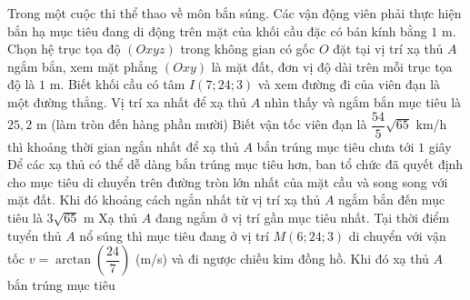 \begin{ex}%
	Trong một cuộc thi thể thao về môn bắn súng. Các vận động viên phải thực hiện bắn hạ mục tiêu đang di động trên mặt của khối cầu đặc có bán kính bằng $1$ m. Chọn hệ trục tọa độ $(Oxyz)$ trong không gian có gốc $O$ đặt tại vị trí xạ thủ $A$ ngắm bắn, xem mặt phẳng $(Oxy)$ là mặt đất, đơn vị độ dài trên mỗi trục tọa độ là $1$ m. Biết khối cầu có tâm $I(7;24;3)$ và xem đường đi của viên đạn là một đường thẳng.
	\choiceTF
	{\True Vị trí xa nhất để xạ thủ $A$ nhìn thấy và ngắm bắn mục tiêu là $25,2$ m (làm tròn đến hàng phần mười)}
	{\True Biết vận tốc viên đạn là $\dfrac{54}{5}\sqrt{65}$ km/h thì khoảng thời gian ngắn nhất để xạ thủ $A$ bắn trúng mục tiêu chưa tới $1$ giây}
	{\True Để các xạ thủ có thể dễ dàng bắn trúng mục tiêu hơn, ban tổ chức đã quyết định cho mục tiêu di chuyển trên đường tròn lớn nhất của mặt cầu và song song với mặt đất. Khi đó khoảng cách ngắn nhất từ vị trí xạ thủ $A$ ngắm bắn đến mục tiêu là $3\sqrt{65}$ m}
	{\True Xạ thủ $A$ đang ngắm ở vị trí gần mục tiêu nhất. Tại thời điểm tuyển thủ $A$ nổ súng thì mục tiêu đang ở vị trí $M(6;24;3)$ di chuyển với vận tốc $v=\arctan\left(\dfrac{24}{7}\right)$ (m/s) và đi ngược chiều kim đồng hồ. Khi đó xạ thủ $A$ bắn trúng mục tiêu}
\end{ex}
